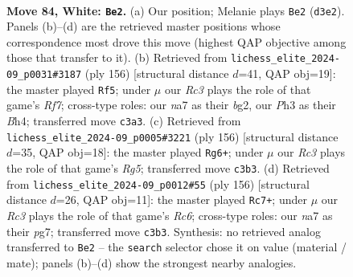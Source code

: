 \documentclass[11pt]{article}
\begin{document}
\clearpage

\begin{figure}[p]\centering
\begin{subfigure}{0.46\textwidth}\centering
\resizebox{\linewidth}{!}{%
\newchessgame
\chessboard[
  setfen={6r1/n7/P2k4/8/3K4/2RB2PP/2P5/8 w - - 1 84},
  showmover=false,
  pgfstyle=straightmove, color=movearrow, markmove={d3-e2}
]}
\caption{}
\end{subfigure}\hfill
\begin{subfigure}{0.46\textwidth}\centering
\resizebox{\linewidth}{!}{%
\newchessgame
\chessboard[
  setfen={2k5/5R2/8/2K4p/2P4B/1r4P1/6b1/8 w - - 47 79},
  showmover=false,
  pgfstyle=straightmove, color=movearrow, markmove={f7-f5}
]}
\caption{}
\end{subfigure}
\\[4pt]
\begin{subfigure}{0.46\textwidth}\centering
\resizebox{\linewidth}{!}{%
\newchessgame
\chessboard[
  setfen={8/8/4k3/6RP/3BK1P1/8/8/7r w - - 1 79},
  showmover=false,
  pgfstyle=straightmove, color=movearrow, markmove={g5-g6}
]}
\caption{}
\end{subfigure}\hfill
\begin{subfigure}{0.46\textwidth}\centering
\resizebox{\linewidth}{!}{%
\newchessgame
\chessboard[
  setfen={1r6/5kp1/1PR5/2BP4/2K5/8/8/8 w - - 7 79},
  showmover=false,
  pgfstyle=straightmove, color=movearrow, markmove={c6-c7}
]}
\caption{}
\end{subfigure}
\caption{\textbf{Move 84, White: \texttt{Be2}.} (a) Our position; Melanie plays \texttt{Be2} (\texttt{d3e2}). Panels (b)--(d) are the retrieved master positions whose correspondence most drove this move (highest QAP objective among those that transfer to it). (b) Retrieved from \texttt{lichess\_elite\_2024-09\_p0031\#3187} (ply 156) [structural distance $d$=41, QAP obj=19]: the master played \texttt{Rf5}; under $\mu$ our \emph{Rc3} plays the role of that game's \emph{Rf7}; cross-type roles: our \emph{n}a7 as their \emph{b}g2, our \emph{P}h3 as their \emph{B}h4; transferred move \texttt{c3a3}. (c) Retrieved from \texttt{lichess\_elite\_2024-09\_p0005\#3221} (ply 156) [structural distance $d$=35, QAP obj=18]: the master played \texttt{Rg6+}; under $\mu$ our \emph{Rc3} plays the role of that game's \emph{Rg5}; transferred move \texttt{c3b3}. (d) Retrieved from \texttt{lichess\_elite\_2024-09\_p0012\#55} (ply 156) [structural distance $d$=26, QAP obj=11]: the master played \texttt{Rc7+}; under $\mu$ our \emph{Rc3} plays the role of that game's \emph{Rc6}; cross-type roles: our \emph{n}a7 as their \emph{p}g7; transferred move \texttt{c3b3}. Synthesis: no retrieved analog transferred to \texttt{Be2} -- the \texttt{search} selector chose it on value (material / mate); panels (b)--(d) show the strongest nearby analogies.}
\label{fig:thought-m166}
\end{figure}
\end{document}
